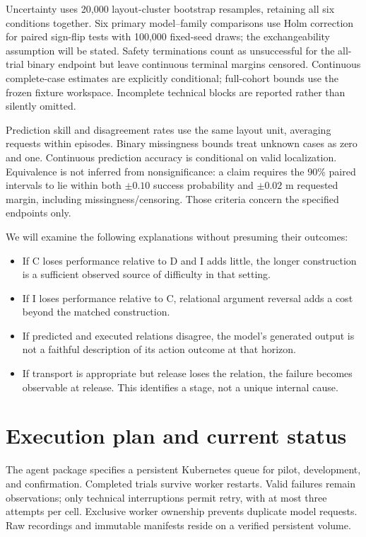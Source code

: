 \documentclass[11pt]{article}
\begin{document}
Uncertainty uses 20,000 layout-cluster bootstrap resamples, retaining all six conditions together. Six primary model--family comparisons use Holm correction for paired sign-flip tests with 100,000 fixed-seed draws; the exchangeability assumption will be stated. Safety terminations count as unsuccessful for the all-trial binary endpoint but leave continuous terminal margins censored. Continuous complete-case estimates are explicitly conditional; full-cohort bounds use the frozen fixture workspace. Incomplete technical blocks are reported rather than silently omitted.

Prediction skill and disagreement rates use the same layout unit, averaging requests within episodes. Binary missingness bounds treat unknown cases as zero and one. Continuous prediction accuracy is conditional on valid localization. Equivalence is not inferred from nonsignificance: a claim requires the 90\% paired intervals to lie within both $\pm0.10$ success probability and $\pm0.02$ m requested margin, including missingness/censoring. Those criteria concern the specified endpoints only.

We will examine the following explanations without presuming their outcomes:
\begin{itemize}
\item If C loses performance relative to D and I adds little, the longer construction is a sufficient observed source of difficulty in that setting.
\item If I loses performance relative to C, relational argument reversal adds a cost beyond the matched construction.
\item If predicted and executed relations disagree, the model's generated output is not a faithful description of its action outcome at that horizon.
\item If transport is appropriate but release loses the relation, the failure becomes observable at release. This identifies a stage, not a unique internal cause.
\end{itemize}



\section{Execution plan and current status}
The agent package specifies a persistent Kubernetes queue for pilot, development, and confirmation. Completed trials survive worker restarts. Valid failures remain observations; only technical interruptions permit retry, with at most three attempts per cell. Exclusive worker ownership prevents duplicate model requests. Raw recordings and immutable manifests reside on a verified persistent volume.
\end{document}
